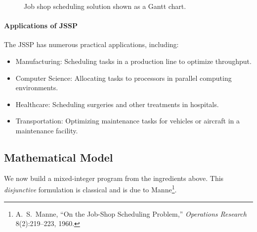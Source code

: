 \begin{figure}
\caption{Job shop scheduling solution shown as a Gantt chart.}\label{fig:jssp}%
\end{figure}



\paragraph{Applications of JSSP}
The JSSP has numerous practical applications, including:
\begin{itemize}
  \item Manufacturing: Scheduling tasks in a production line to optimize throughput.
  \item Computer Science: Allocating tasks to processors in parallel computing environments.
  \item Healthcare: Scheduling surgeries and other treatments in hospitals.
  \item Transportation: Optimizing maintenance tasks for vehicles or aircraft in a maintenance facility.
\end{itemize}


\subsection{Mathematical Model}

We now build a mixed-integer program from the ingredients above.
This \emph{disjunctive} formulation is classical and is due to Manne\footnote{A.~S.~Manne, ``On the Job-Shop Scheduling Problem,'' \emph{Operations Research} 8(2):219--223, 1960.}.

